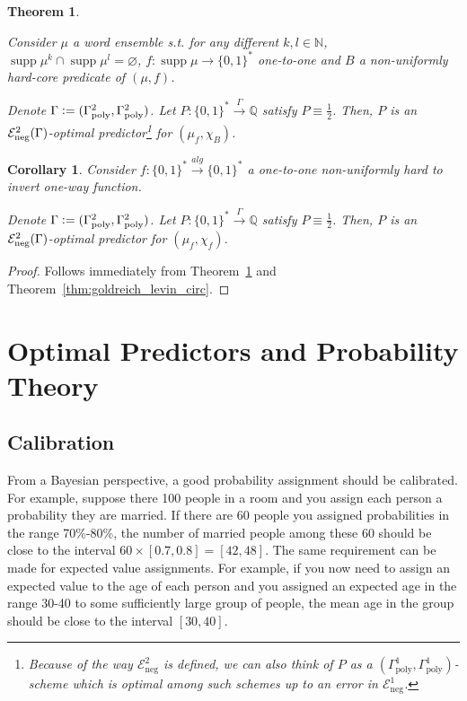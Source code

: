 \documentclass{article}
\numberwithin{equation}{section}
\theoremstyle{definition}
\theoremstyle{plain}
\newtheorem{theorem}{Theorem}[section]
\newtheorem{corollary}{Corollary}[section]
\newcommand{\Words}{{\{ 0, 1 \}^*}}
\DeclareMathOperator{\Supp}{supp}
\newcommand{\Nats}{\mathbb{N}}
\newcommand{\Rats}{\mathbb{Q}}
\begin{document}
\begin{theorem}
\label{thm:hard_core_circ}

Consider $\mu$ a word ensemble s.t. for any different $k,l \in \Nats$, $\Supp \mu^k \cap \Supp \mu^l = \varnothing$, $f: \Supp \mu \rightarrow \Words$ one-to-one and $B$ a non-uniformly hard-core predicate of $(\mu,f)$. 

Denote $\Gamma:=(\Gamma_{\textnormal{poly}}^2,\Gamma_{\textnormal{poly}}^2)$. Let $P: \Words \xrightarrow{\Gamma} \Rats$ satisfy $P \equiv \frac{1}{2}$. Then, $P$ is an $\mathcal{E}_{\textnormal{neg}}^2(\Gamma)$-optimal predictor\footnote{Because of the way $\mathcal{E}_{\text{neg}}^2$ is defined, we can also think of $P$ as a $(\Gamma_{\text{poly}}^1,\Gamma_{\text{poly}}^1)$-scheme which is optimal among such schemes up to an error in $\mathcal{E}_{\text{neg}}^1$.} for $(\mu_f, \chi_B)$.

\end{theorem}

\begin{corollary}

Consider $f: \Words \xrightarrow{alg} \Words$ a one-to-one non-uniformly hard to invert one-way function.

Denote $\Gamma:=(\Gamma_{\textnormal{poly}}^2,\Gamma_{\textnormal{poly}}^2)$. Let $P: \Words \xrightarrow{\Gamma} \Rats$ satisfy $P \equiv \frac{1}{2}$. Then, $P$ is an $\mathcal{E}_{\textnormal{neg}}^2(\Gamma)$-optimal predictor for $(\mu_f, \chi_f)$.

\end{corollary}

\begin{proof}

Follows immediately from Theorem~\ref{thm:hard_core_circ} and Theorem~\ref{thm:goldreich_levin_circ}.

\end{proof}

\section{Optimal Predictors and Probability Theory}
\label{sec:probability}

\subsection{Calibration}

From a Bayesian perspective, a good probability assignment should be calibrated. For example, suppose there 100 people in a room and you assign each person a probability they are married. If there are 60 people you assigned probabilities in the range 70\%-80\%, the number of married people among these 60 should be close to the interval $60 \times [0.7, 0.8] = [42,48]$. The same requirement can be made for expected value assignments. For example, if you now need to assign an expected value to the age of each person and you assigned an expected age in the range 30-40 to some sufficiently large group of people, the mean age in the group should be close to the interval $[30,40]$. 
\end{document}
